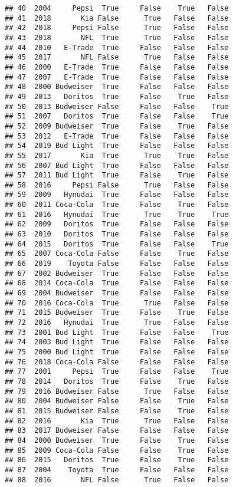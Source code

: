 \documentclass[
]{article}
\begin{document}
\begin{verbatim}
## 40  2004     Pepsi  True     False    True   False
## 41  2018       Kia False      True   False   False
## 42  2018     Pepsi False      True   False   False
## 43  2018       NFL  True      True   False   False
## 44  2010   E-Trade  True     False   False   False
## 45  2017       NFL False      True   False   False
## 46  2000   E-Trade  True     False   False   False
## 47  2007   E-Trade  True     False   False   False
## 48  2000 Budweiser  True     False   False   False
## 49  2013   Doritos  True     False    True   False
## 50  2013 Budweiser False     False   False    True
## 51  2007   Doritos  True     False   False    True
## 52  2009 Budweiser  True     False    True   False
## 53  2012   E-Trade  True     False   False   False
## 54  2019 Bud Light  True     False   False   False
## 55  2017       Kia  True      True    True   False
## 56  2007 Bud Light  True     False   False   False
## 57  2011 Bud Light  True     False    True   False
## 58  2016     Pepsi False      True   False   False
## 59  2009   Hynudai  True     False   False   False
## 60  2011 Coca-Cola  True     False    True   False
## 61  2016   Hynudai  True      True    True    True
## 62  2009   Doritos  True     False   False   False
## 63  2010   Doritos  True     False   False   False
## 64  2015   Doritos  True     False   False    True
## 65  2007 Coca-Cola False     False    True   False
## 66  2019    Toyota False     False   False   False
## 67  2002 Budweiser  True     False   False   False
## 68  2014 Coca-Cola  True     False   False   False
## 69  2004 Budweiser  True     False   False   False
## 70  2016 Coca-Cola  True      True   False   False
## 71  2015 Budweiser  True     False    True   False
## 72  2016   Hynudai  True      True   False   False
## 73  2001 Bud Light  True     False   False    True
## 74  2003 Bud Light  True     False   False   False
## 75  2000 Bud Light  True     False   False   False
## 76  2018 Coca-Cola False     False   False   False
## 77  2001     Pepsi  True     False   False    True
## 78  2014   Doritos  True     False    True   False
## 79  2016 Budweiser False      True   False   False
## 80  2004 Budweiser False     False    True   False
## 81  2015 Budweiser False     False    True   False
## 82  2016       Kia  True      True   False   False
## 83  2017 Budweiser False     False   False   False
## 84  2000 Budweiser  True     False    True   False
## 85  2009 Coca-Cola False     False    True   False
## 86  2015   Doritos  True     False    True   False
## 87  2004    Toyota  True     False   False   False
## 88  2016       NFL False      True   False   False

\end{verbatim}
\end{document}
